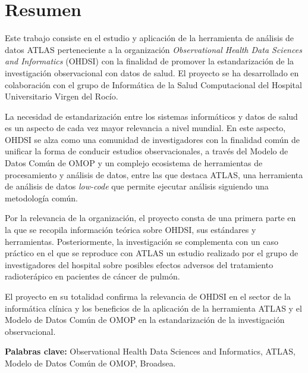 \chapter*{Resumen}

Este trabajo consiste en el estudio y aplicación de la herramienta de análisis de datos ATLAS perteneciente a la organización \textit{Observational Health Data Sciences and Informatics} (OHDSI) con la finalidad de promover la estandarización de la investigación observacional con datos de salud. El proyecto se ha desarrollado en colaboración con el grupo de Informática de la Salud Computacional del Hospital Universitario Virgen del Rocío.

La necesidad de estandarización entre los sistemas informáticos y datos de salud es un aspecto de cada vez mayor relevancia a nivel mundial. En este aspecto, OHDSI se alza como una comunidad de investigadores con la finalidad común de unificar la forma de conducir estudios observacionales, a través del Modelo de Datos Común de OMOP y un complejo ecosistema de herramientas de procesamiento y análisis de datos, entre las que destaca ATLAS, una herramienta de análisis de datos \textit{low-code} que permite ejecutar análisis siguiendo una metodología común.

Por la relevancia de la organización, el proyecto consta de una primera parte en la que se recopila información teórica sobre OHDSI, sus estándares y herramientas. Posteriormente, la investigación se complementa con un caso práctico en el que se reproduce con ATLAS un estudio realizado por el grupo de investigadores del hospital sobre posibles efectos adversos del tratamiento radioterápico en pacientes de cáncer de pulmón.

El proyecto en su totalidad confirma la relevancia de OHDSI en el sector de la informática clínica y los beneficios de la aplicación de la herramienta ATLAS y el Modelo de Datos Común de OMOP en la estandarización de la investigación observacional.


\vspace{.5cm}

\textbf{Palabras clave:} Observational Health Data Sciences and Informatics, ATLAS, Modelo de Datos Común de OMOP, Broadsea.